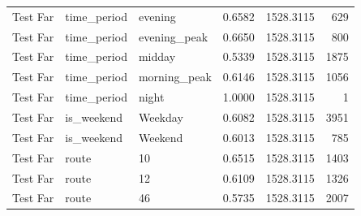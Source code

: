 \begin{table}
\begin{tabular}{lllrrr}
Test Far & time_period & evening & 0.6582 & 1528.3115 & 629 \\
Test Far & time_period & evening_peak & 0.6650 & 1528.3115 & 800 \\
Test Far & time_period & midday & 0.5339 & 1528.3115 & 1875 \\
Test Far & time_period & morning_peak & 0.6146 & 1528.3115 & 1056 \\
Test Far & time_period & night & 1.0000 & 1528.3115 & 1 \\
Test Far & is_weekend & Weekday & 0.6082 & 1528.3115 & 3951 \\
Test Far & is_weekend & Weekend & 0.6013 & 1528.3115 & 785 \\
Test Far & route & 10 & 0.6515 & 1528.3115 & 1403 \\
Test Far & route & 12 & 0.6109 & 1528.3115 & 1326 \\
Test Far & route & 46 & 0.5735 & 1528.3115 & 2007 \\
\bottomrule
\end{tabular}
\end{table}
